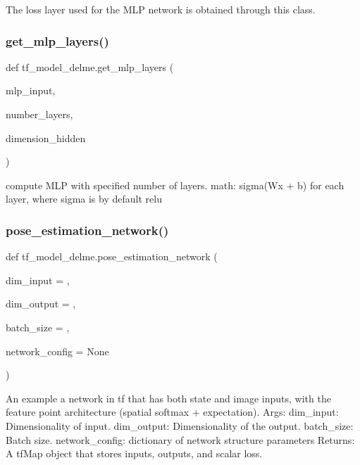 \begin{DoxyVerb}The loss layer used for the MLP network is obtained through this class.\end{DoxyVerb}
 \hypertarget{namespacetf__model__delme_a2518cdb8353b343932ddb0e0c6249232}{}\label{namespacetf__model__delme_a2518cdb8353b343932ddb0e0c6249232} 
\subsubsection{\texorpdfstring{get\+\_\+mlp\+\_\+layers()}{get\_mlp\_layers()}}
{\footnotesize\ttfamily def tf\+\_\+model\+\_\+delme.\+get\+\_\+mlp\+\_\+layers (\begin{DoxyParamCaption}\item[{}]{mlp\+\_\+input,  }\item[{}]{number\+\_\+layers,  }\item[{}]{dimension\+\_\+hidden }\end{DoxyParamCaption})}

\begin{DoxyVerb}compute MLP with specified number of layers.
    math: sigma(Wx + b)
    for each layer, where sigma is by default relu\end{DoxyVerb}
 \hypertarget{namespacetf__model__delme_a003783bd07e757645fb97863107aae3a}{}\label{namespacetf__model__delme_a003783bd07e757645fb97863107aae3a} 
\subsubsection{\texorpdfstring{pose\+\_\+estimation\+\_\+network()}{pose\_estimation\_network()}}
{\footnotesize\ttfamily def tf\+\_\+model\+\_\+delme.\+pose\+\_\+estimation\+\_\+network (\begin{DoxyParamCaption}\item[{}]{dim\+\_\+input = {},  }\item[{}]{dim\+\_\+output = {},  }\item[{}]{batch\+\_\+size = {},  }\item[{}]{network\+\_\+config = {\ttfamily None} }\end{DoxyParamCaption})}

\begin{DoxyVerb}An example a network in tf that has both state and image inputs, with the feature
point architecture (spatial softmax + expectation).
Args:
    dim_input: Dimensionality of input.
    dim_output: Dimensionality of the output.
    batch_size: Batch size.
    network_config: dictionary of network structure parameters
Returns:
    A tfMap object that stores inputs, outputs, and scalar loss.
\end{DoxyVerb}
 
